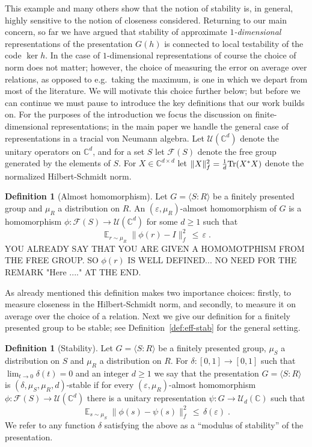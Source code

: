 \documentclass[11pt]{article}
\theoremstyle{definition}
\newtheorem{definition}[theorem]{Definition}
\newcommand{\Tr}{\mbox{\rm Tr}}
\newcommand{\Id}{\ensuremath{I}}
\DeclareMathOperator*{\Expectation}{\mathbb{E}}
\newcommand{\Es}[1]{\Expectation_{#1}}
\newcommand{\C}{\ensuremath{\mathbb{C}}}
\newcommand{\mF}{\ensuremath{\mathcal{F}}}
\newcommand{\mU}{\ensuremath{\mathcal{U}}}
\newcommand{\eps}{\varepsilon}
\begin{document}
This example and many others show that the notion of stability is, in general, highly sensitive to the notion of closeness considered. Returning to our main concern, so far we have argued that 
stability of approximate \emph{$1$-dimensional} representations of the presentation $G(h)$ is connected to local testability of the code $\ker h$. In the case of $1$-dimensional representations of course the choice of norm does not matter; however, the choice of measuring the error on average over relations, as opposed to e.g.\ taking the maximum, is one in which we depart from most of the literature. We will motivate this choice further below; but before we can continue we must pause to introduce the key definitions that our work builds on. For the purposes of the introduction we focus the discussion on finite-dimensional representations; in the main paper we handle the general case of representations in a tracial von Neumann algebra. Let $\mU(\C^d)$ denote the unitary operators on $\C^d$, and for a set $S$ let $\mF(S)$ denote the free group generated by the elements of $S$. For $X\in \C^{d\times d}$ let $\|X\|_f^2 = \frac{1}{d}\Tr(X^* X)$ denote the normalized Hilbert-Schmidt norm. 

\begin{definition}[Almost homomorphism]\label{def:approx-hom-intro}
Let $G = \langle S:R\rangle $ be a finitely presented group and $\mu_R$ a distribution on $R$. An $(\eps,\mu_R)$-almost homomorphism of $G$ is a homomorphism $\phi:\mF(S)\to\mU(\C^d)$ for some $d\geq 1$ such that
\[ \Es{r\sim \mu_R} \big\|  \phi(r) - \Id \big \|_f^2 \,\leq\, \eps\;.\]
{\color{red} YOU ALREADY SAY THAT YOU ARE GIVEN A HOMOMOTPHISM FROM THE FREE GROUP. SO $\phi(r)$ IS WELL DEFINED... NO NEED FOR THE REMARK "Here ...." AT THE END}.
\end{definition}

As already mentioned this definition makes two importance choices: firstly, to measure closeness in the Hilbert-Schmidt norm, and secondly, to measure it on average over the choice of a relation. Next we give our definition for a finitely presented group to be stable; see Definition~\ref{def:eff-stab} for the general setting. 

\begin{definition}[Stability]\label{def:eff-stab-intro}
Let $G = \langle S:R\rangle $ be a finitely presented group, $\mu_S$ a distribution on $S$ and $\mu_R$ a distribution on $R$. For $\delta:[0,1]\to[0,1]$ such that $\lim_{t\to 0}\delta(t)=0$ and an integer $d\geq 1$ we say that the presentation $G=\langle S:R\rangle$ is $(\delta,\mu_S,\mu_R,d)$-stable if for every $(\eps,\mu_R)$-almost homomorphism $\phi: \mF(S) \to \mU(\C^d)$ there is a unitary representation $\psi: G \to \mU_d(\C)$ such that
\[ \Es{s\sim \mu_S} \big\|  \phi(s) - \psi(s) \big \|_f^2 \,\leq\, \delta(\eps)\;.\]
We refer to any function $\delta$ satisfying the above as a ``modulus of stability'' of the presentation.
\end{definition}
\end{document}
